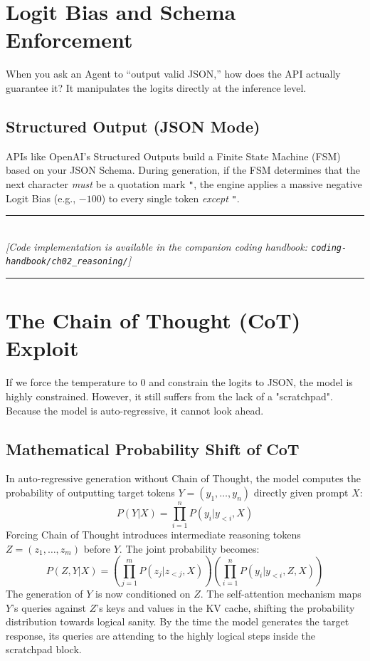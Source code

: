 \section{Logit Bias and Schema Enforcement}

When you ask an Agent to ``output valid JSON,'' how does the API actually guarantee it? It manipulates the logits directly at the inference level.

\subsection{Structured Output (JSON Mode)}
APIs like OpenAI's Structured Outputs build a Finite State Machine (FSM) based on your JSON Schema. During generation, if the FSM determines that the next character \textit{must} be a quotation mark \texttt{"}, the engine applies a massive negative Logit Bias (e.g., $-100$) to every single token \textit{except} \texttt{"}. 


\begin{center}
\noindent\rule{0.6\textwidth}{0.4pt} \\
\vspace{0.3em}
\textit{[Code implementation is available in the companion coding handbook: \texttt{coding-handbook/ch02\_reasoning/}]} \\
\noindent\rule{0.6\textwidth}{0.4pt}
\end{center}


\section{The Chain of Thought (CoT) Exploit}

If we force the temperature to 0 and constrain the logits to JSON, the model is highly constrained. However, it still suffers from the lack of a "scratchpad". Because the model is auto-regressive, it cannot look ahead.

\subsection{Mathematical Probability Shift of CoT}
In auto-regressive generation without Chain of Thought, the model computes the probability of outputting target tokens $Y = (y_1, \dots, y_n)$ directly given prompt $X$:
\begin{equation}
P(Y | X) = \prod_{i=1}^n P(y_i | y_{<i}, X)
\end{equation}
Forcing Chain of Thought introduces intermediate reasoning tokens $Z = (z_1, \dots, z_m)$ before $Y$. The joint probability becomes:
\begin{equation}
P(Z, Y | X) = \left( \prod_{j=1}^m P(z_j | z_{<j}, X) \right) \left( \prod_{i=1}^n P(y_i | y_{<i}, Z, X) \right)
\end{equation}
The generation of $Y$ is now conditioned on $Z$. The self-attention mechanism maps $Y$'s queries against $Z$'s keys and values in the KV cache, shifting the probability distribution towards logical sanity. By the time the model generates the target response, its queries are attending to the highly logical steps inside the scratchpad block.

